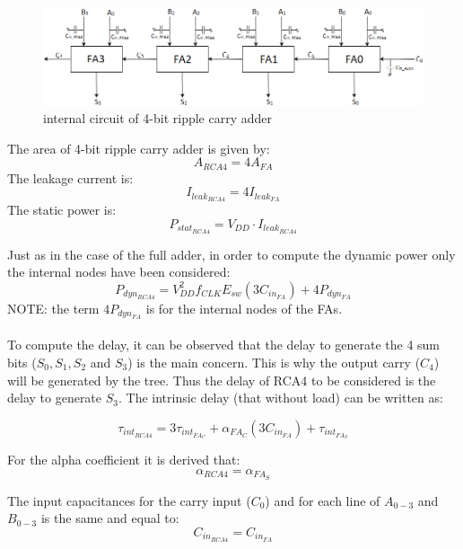 \begin{figure}[H]
\centering
\includegraphics[width = 14cm]{pentium/rca4_interno_copia.png}
\caption{internal circuit of 4-bit ripple carry adder}
\label{rca4_interno}
\end{figure}

The  area of 4-bit ripple carry adder is given by:
\begin{equation}
A_{RCA4}=4A_{FA}
\end{equation}
The leakage current is:
\begin{equation}
I_{leak_{RCA4}}=4I_{leak_{FA}}
\end{equation}
The static power is:
\begin{equation}
P_{stat_{RCA4}}=V_{DD}\cdot I_{leak_{RCA4}}
\end{equation}

Just as in the case of the full adder, in order to compute the dynamic power only the internal nodes have been considered:
\begin{equation}
P_{dyn_{RCA4}}=V_{DD}^2f_{CLK}E_{sw}(3C_{in_{FA}})+4P_{dyn_{FA}}
\end{equation}
NOTE: the term $4P_{dyn_{FA}}$ is for the internal nodes of the FAs.\\\\
To compute the delay, it can be observed that the delay to generate the 4 sum bits ($S_0, S_1, S_2$ and $S_3$) is the main concern. This is why the output carry ($C_4$) will be generated by the tree. Thus the delay of RCA4 to be considered is the delay to generate $S_3$. The intrinsic delay (that without load) can be written as:

\begin{equation}
\tau_{int_{RCA4}} = 3\tau_{int_{FA_{C}}}+\alpha_{FA_{C}}(3C_{in_{FA}})+\tau_{int_{FA_{S}}}
\end{equation}

For the alpha coefficient it is derived that:
\begin{equation}
\alpha_{RCA4}=\alpha_{FA_{S}}
\end{equation}

The input capacitances for the carry input ($C_0$) and for each line of $A_{0-3}$ and $B_{0-3}$ is the same and equal to:
\begin{equation}
C_{in_{RCA4}}=C_{in_{FA}}
\end{equation}





